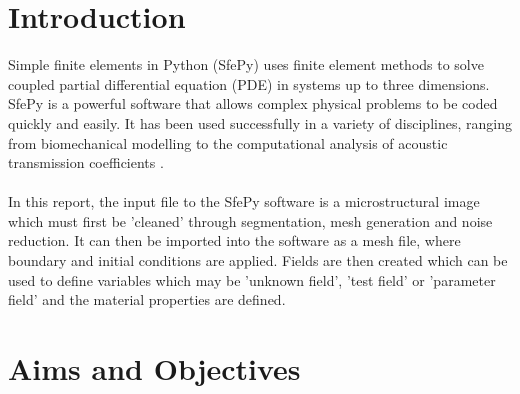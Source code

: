 \documentclass[\report.tex]{subfiles}
\begin{document}
\section{Introduction}
Simple finite elements in Python (SfePy) uses finite element methods to solve coupled partial differential equation (PDE) in systems up to three dimensions. SfePy is a powerful software that allows complex physical problems to be coded quickly and easily. It has been used successfully in a variety of disciplines, ranging from biomechanical modelling \cite{biomedapplication} to the computational analysis of acoustic transmission coefficients \cite{AcousticTransmission}.\\
\\In this report, the input file to the SfePy software is a microstructural image which must first be 'cleaned' through segmentation, mesh generation and noise reduction. It can then be imported into the software as a mesh file, where boundary and initial conditions are applied. Fields are then created which can be used to define variables which may be 'unknown field', 'test field' or 'parameter field' \cite{FEMinSfePy} and the material properties are defined.

\section{Aims and Objectives}
\end{document}
